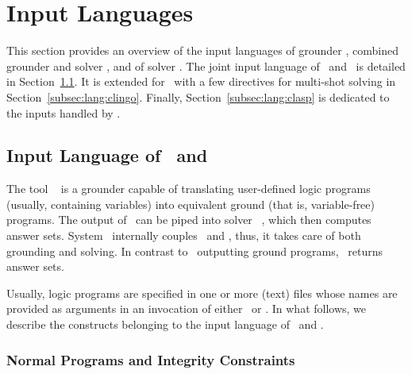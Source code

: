 \section{Input Languages}\label{sec:language}

This section provides an overview of the input languages of
grounder \gringo, combined grounder and solver \clingo, 
and of solver \clasp.
The joint input language of \gringo\ and \clingo\ is detailed in
Section~\ref{subsec:lang:gringo}.
It is extended for \clingo\ with a few directives for multi-shot solving in Section~\ref{subsec:lang:clingo}.
Finally, Section~\ref{subsec:lang:clasp} is dedicated to the inputs handled by \clasp.

\subsection{Input Language of \gringo\ and \clingo}\label{subsec:lang:gringo}

The tool \gringo~\cite{gescth07a} is a grounder capable of translating
user-defined logic programs (usually, containing variables) into 
equivalent ground (that is, variable-free) programs.
The output of \gringo\ can be piped into solver \clasp~\cite{gekanesc07a,gekasc09c},
which then computes answer sets.
System \clingo\ internally couples \gringo\ and \clasp, thus,
it takes care of both grounding and solving.
In contrast to \gringo\ outputting ground programs, 
\clingo\ returns answer sets.

Usually, logic programs are specified in one or more (text) files whose names are
provided as arguments
in an invocation of either \gringo\ or \clingo.
In what follows, we describe the 
constructs belonging to the input language of \gringo\ and \clingo.

\subsubsection{Normal Programs and Integrity Constraints}\label{subsec:gringo:normal}


